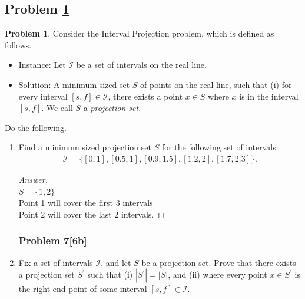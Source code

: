 \documentclass[11pt]{article}
\theoremstyle{definition}
\theoremstyle{definition}
\newtheorem{required}{Problem}
\theoremstyle{definition}
\newcommand{\interval}[4]{\draw (#2, #1) -- (#3, #1); %
\draw (#2, #1-0.11) -- (#2, #1+0.11); %
\draw (#3, #1-0.11) -- (#3, #1+0.11); %
\node[] at (#2-0.25, #1) {#4};
}
\begin{document}
\newpage
\subsection{Problem \ref{Exchange2}}

\begin{required} \label{Exchange2}
Consider the \textsf{Interval Projection} problem, which is defined as follows.
\begin{itemize}
\item \textsf{Instance:} Let $\mathcal{I}$ be a set of intervals on the real line.
\item \textsf{Solution:} A minimum sized set $S$ of points on the real line, such that (i) for every interval $[s, f] \in \mathcal{I}$, there exists a point $x \in S$ where $x$ is in the interval $[s, f]$. We call $S$ a \textit{projection set}.
\end{itemize}

\noindent Do the following.
\begin{enumerate}[label=(\alph*)]
\subsubsection{Problem 7\ref{6a}}
\item \label{6a} Find a minimum sized projection set $S$ for the following set of intervals:
\begin{align*}
\mathcal{I} = \{ [0, 1], [0.5, 1], [0.9, 1.5], [1.2, 2], [1.7, 2.3] \}.
\end{align*}


\begin{proof}[Answer]
\\
$S = \{1,2\}$\\
Point 1 will cover the first 3 intervals\\
Point 2 will cover the last 2 intervals.
\end{proof}

\newpage
\subsubsection{Problem 7\ref{6b}}
\item \label{6b} Fix a set of intervals $\mathcal{I}$, and let $S$ be a projection set. Prove that there exists a projection set $S^{\prime}$ such that (i) $|S^{\prime}| = |S|$, and (ii) where every point $x \in S^{\prime}$ is the right end-point of some interval $[s, f] \in \mathcal{I}$. 


\end{enumerate}
\end{required}
\end{document}
